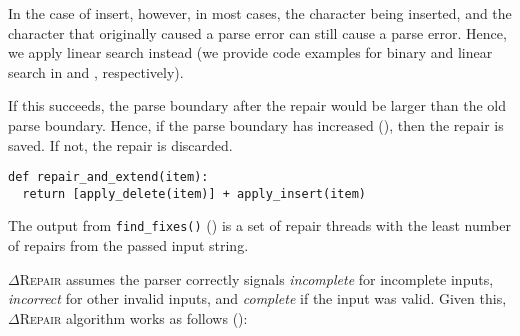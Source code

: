 \documentclass[acmsmall,screen,review,anonymous]{acmart}
\newcommand{\approach}{\textsc{$\Delta$Repair}\xspace}
\newcommand{\drepair}{\approach}
\def\<#1>{\texttt{#1}}
\begin{document}
In the case of insert, however, in most cases, the character being inserted,
and the character that originally caused a parse error can still cause a parse
error. Hence, we apply linear search instead (we provide code examples for binary and linear search in  and , respectively).%
\par
If this succeeds, the parse boundary after the repair
would be larger than the old parse boundary. Hence, if the parse boundary has
increased (), then
the
repair is saved. If not, the repair is discarded.
\begin{lstlisting}[caption=Repair and extend,label={lst:repairandextend}]
def repair_and_extend(item):
  return [apply_delete(item)] + apply_insert(item)
\end{lstlisting}
\vspace{\baselineskip}

The output from \<find\_fixes()> () is a set of repair
threads with the least number of repairs from the passed input string.

\approach assumes the parser correctly signals
\emph{incomplete} for incomplete inputs, \emph{incorrect} for other invalid
inputs, and \emph{complete} if the input was valid. 
Given this, \drepair algorithm works as follows ():
\end{document}
